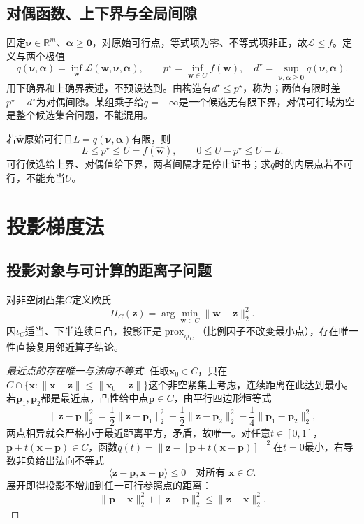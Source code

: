 \subsection{对偶函数、上下界与全局间隙}

固定$\bm\nu\in\mathbb R^m$、$\bm\alpha\geq\bm0$，对原始可行点，等式项为零、不等式项非正，故$\mathcal L\leq f$。定义与两个极值
\[
 q(\bm\nu,\bm\alpha)=\inf_{\bm w}\mathcal L(\bm w,\bm\nu,\bm\alpha),\qquad
 p^\star=\inf_{\bm w\in C}f(\bm w),\quad
 d^\star=\sup_{\bm\nu,\bm\alpha\geq\bm0}q(\bm\nu,\bm\alpha).
\]
用下确界和上确界表述，不预设达到。由构造有$d^\star\leq p^\star$，称为；两值有限时差$p^\star-d^\star$为对偶间隙。某组乘子给$q=-\infty$是一个候选无有限下界，对偶可行域为空是整个候选集合问题，不能混用。

若$\widehat{\bm w}$原始可行且$L=q(\bm\nu,\bm\alpha)$有限，则
\begin{equation}
 L\leq p^\star\leq U=f(\widehat{\bm w}),\qquad
 0\leq U-p^\star\leq U-L.
 \label{eq:opt-duality-certificate}
\end{equation}
可行候选给上界、对偶值给下界，两者间隔才是停止证书；求$q$时的内层点若不可行，不能充当$U$。

\section{投影梯度法}

\subsection{投影对象与可计算的距离子问题}

对非空闭凸集$C$定义欧氏
\begin{equation}
 \Pi_C(\bm z)=\arg\min_{\bm w\in C}\lVert\bm w-\bm z\rVert_2^2.
 \label{eq:opt-projection}
\end{equation}
因$\iota_C$适当、下半连续且凸，投影正是$\operatorname{prox}_{\eta\iota_C}$（比例因子不改变最小点），存在唯一性直接复用邻近算子结论。

\begin{proof}[最近点的存在唯一与法向不等式]
任取$\bm x_0\in C$，只在$C\cap\{\bm x:\|\bm x-\bm z\|\leq\|\bm x_0-\bm z\|\}$这个非空紧集上考虑，连续距离在此达到最小。若$\bm p_1,\bm p_2$都是最近点，凸性给中点$\bm p\in C$，由平行四边形恒等式
\[
 \|\bm z-\bm p\|_2^2
 =\frac12\|\bm z-\bm p_1\|_2^2+\frac12\|\bm z-\bm p_2\|_2^2
 -\frac14\|\bm p_1-\bm p_2\|_2^2,
\]
两点相异就会严格小于最近距离平方，矛盾，故唯一。对任意$t\in[0,1]$，$\bm p+t(\bm x-\bm p)\in C$，函数$q(t)=\|\bm z-[\bm p+t(\bm x-\bm p)]\|^2$在$t=0$最小，右导数非负给出法向不等式
\begin{equation}
 \langle\bm z-\bm p,\bm x-\bm p\rangle\leq0
 \quad\text{对所有 }\bm x\in C.
 \label{eq:opt-projection-normal}
\end{equation}
展开即得投影不增加到任一可行参照点的距离：
\begin{equation}
 \|\bm p-\bm x\|_2^2+\|\bm z-\bm p\|_2^2\leq\|\bm z-\bm x\|_2^2.
 \label{eq:opt-projection-distance}
\end{equation}
\end{proof}

